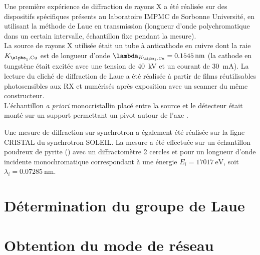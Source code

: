 Une première expérience de diffraction de rayons X a été réalisée sur des dispositifs spécifiques présents au laboratoire IMPMC de Sorbonne Université, en utilisant la méthode de Laue en transmission (longueur d'onde polychromatique dans un certain intervalle, échantillon fixe pendant la mesure).\\
La source de rayons X utilisée était un tube à anticathode en cuivre dont la raie \(K_{\alpha_1,\ce{Cu}}\) est de longueur d'onde \(\lambda_{K_{\alpha_1,\ce{Cu}}}=\SI{0.1545}{\nano\metre}\) (la cathode en tungstène était excitée avec une tension de \SI{40}{\kilo\volt} et un courant de \SI{30}{\milli\ampere}). La lecture du cliché de diffraction de Laue a été réalisée à partir de films réutilisables photosensibles aux RX et numérisés après exposition avec un scanner du même constructeur.\\
L'échantillon \textit{a priori} monocristallin placé entre la source et le détecteur était monté sur un support permettant un pivot autour de l'axe \hmn{[hkl]}.

Une mesure de diffraction sur synchrotron a également été réalisée sur la ligne CRISTAL du synchrotron SOLEIL. La mesure a été effectuée sur un échantillon poudreux de pyrite () avec un diffractomètre 2 cercles et pour un longueur d'onde incidente monochromatique correspondant à une énergie \(E_i = \SI{17017}{\electronvolt}\), soit \(\lambda_i = \SI{0.07285}{\nano\metre}\).\\

\section{Détermination du groupe de Laue}

\section{Obtention du mode de réseau}

